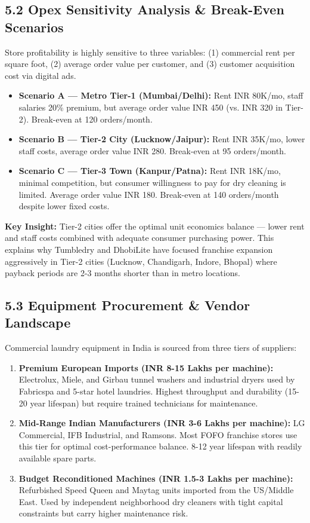 \documentclass[11pt,a4paper]{article}
\begin{document}
\subsection{5.2 Opex Sensitivity Analysis \& Break-Even Scenarios}
Store profitability is highly sensitive to three variables: (1) commercial rent per square foot, (2) average order value per customer, and (3) customer acquisition cost via digital ads.

\begin{tcolorbox}[colback=bluebg,colframe=blueaccent,title=\textbf{Break-Even Sensitivity Table:}]
\begin{itemize}[leftmargin=*]
    \item \textbf{Scenario A --- Metro Tier-1 (Mumbai/Delhi):} Rent INR 80K/mo, staff salaries 20\% premium, but average order value INR 450 (vs. INR 320 in Tier-2). Break-even at 120 orders/month.
    \item \textbf{Scenario B --- Tier-2 City (Lucknow/Jaipur):} Rent INR 35K/mo, lower staff costs, average order value INR 280. Break-even at 95 orders/month.
    \item \textbf{Scenario C --- Tier-3 Town (Kanpur/Patna):} Rent INR 18K/mo, minimal competition, but consumer willingness to pay for dry cleaning is limited. Average order value INR 180. Break-even at 140 orders/month despite lower fixed costs.
\end{itemize}
\end{tcolorbox}

\vspace{0.4cm}
\textbf{Key Insight:} Tier-2 cities offer the optimal unit economics balance --- lower rent and staff costs combined with adequate consumer purchasing power. This explains why Tumbledry and DhobiLite have focused franchise expansion aggressively in Tier-2 cities (Lucknow, Chandigarh, Indore, Bhopal) where payback periods are 2-3 months shorter than in metro locations.

\subsection{5.3 Equipment Procurement \& Vendor Landscape}
Commercial laundry equipment in India is sourced from three tiers of suppliers:
\begin{enumerate}
    \item \textbf{Premium European Imports (INR 8-15 Lakhs per machine):} Electrolux, Miele, and Girbau tunnel washers and industrial dryers used by Fabricspa and 5-star hotel laundries. Highest throughput and durability (15-20 year lifespan) but require trained technicians for maintenance.
    \item \textbf{Mid-Range Indian Manufacturers (INR 3-6 Lakhs per machine):} LG Commercial, IFB Industrial, and Ramsons. Most FOFO franchise stores use this tier for optimal cost-performance balance. 8-12 year lifespan with readily available spare parts.
    \item \textbf{Budget Reconditioned Machines (INR 1.5-3 Lakhs per machine):} Refurbished Speed Queen and Maytag units imported from the US/Middle East. Used by independent neighborhood dry cleaners with tight capital constraints but carry higher maintenance risk.
\end{enumerate}
\end{document}
